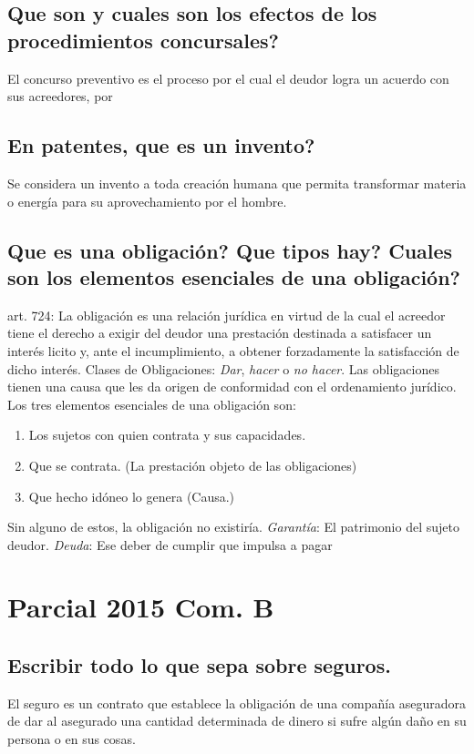 \documentclass{article}
\begin{document}
\subsection{Que son y cuales son los efectos de los procedimientos concursales?}
El concurso preventivo es el proceso por el cual el deudor logra un acuerdo con sus acreedores, por 

\subsection{En patentes, que es un invento?}
Se considera un invento a toda creación humana que permita transformar materia o energía para su aprovechamiento por el hombre.

\subsection{Que es una obligación? Que tipos hay? Cuales son los elementos esenciales de una obligación?}
\label{sec:QueEsObligacionTiposDeOblElementosDeOblYDeudaGarantia}
art. 724: La obligación es una relación jurídica en virtud de la cual el acreedor tiene el derecho a exigir del deudor una prestación destinada a satisfacer un interés licito y, ante el incumplimiento, a obtener forzadamente la satisfacción de dicho interés.
	Clases de Obligaciones: \textit{Dar}, \textit{hacer} o \textit{no hacer}. 
	Las obligaciones tienen una causa que les da origen de conformidad con el ordenamiento jurídico. Los tres elementos esenciales de una obligación son:
\begin{enumerate}
\item Los sujetos con quien contrata y sus capacidades.
\item Que se contrata. (La prestación objeto de las obligaciones)
\item Que hecho idóneo lo genera (Causa.)
\end{enumerate}
Sin alguno de estos, la obligación no existiría.
\textit{Garantía}: El patrimonio del sujeto deudor. \textit{Deuda}: Ese deber de cumplir que impulsa a pagar

\section{Parcial 2015 Com. B}
\subsection{Escribir todo lo que sepa sobre seguros.}
El seguro es un contrato que establece la obligación de una compañía aseguradora de dar al asegurado una cantidad determinada de dinero si sufre algún daño en su persona o en sus cosas. 
\end{document}
